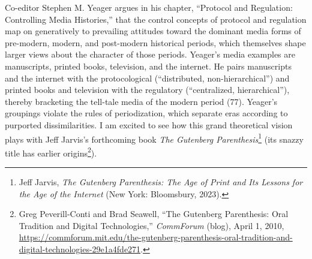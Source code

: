 \documentclass{tufte-handout}
\begin{document}
Co-editor Stephen M. Yeager argues in his chapter, ``Protocol and
Regulation: Controlling Media Histories,'' that the control concepts of
protocol and regulation map on generatively to prevailing attitudes
toward the dominant media forms of pre-modern, modern, and post-modern
historical periods, which themselves shape larger views about the
character of those periods. Yeager's media examples are manuscripts,
printed books, television, and the internet. He pairs manuscripts and
the internet with the protocological (``distributed, non-hierarchical'')
and printed books and television with the regulatory (``centralized,
hierarchical''), thereby bracketing the tell-tale media of the modern
period (77). Yeager's groupings violate the rules of periodization,
which separate eras according to purported dissimilarities. I am excited
to see how this grand theoretical vision plays with Jeff Jarvis's
forthcoming book \emph{The Gutenberg Parenthesis}\footnote{Jeff Jarvis,
  \emph{The Gutenberg Parenthesis: The Age of Print and Its Lessons for
  the Age of the Internet} (New York: Bloomsbury, 2023).} (its snazzy
title has earlier origins\footnote{Greg Peverill-Conti and Brad Seawell,
  ``The Gutenberg Parenthesis: Oral Tradition and Digital
  Technologies,'' \emph{CommForum} (blog), April 1, 2010,
  \href{https://commforum.mit.edu/the-gutenberg-parenthesis-oral-tradition-and-digital-technologies-29e1a4fde271}{https://commforum.mit.edu/the-gutenberg-parenthesis-oral-tradition-and-digital-technologies-29e1a4fde271}.}).
\end{document}
